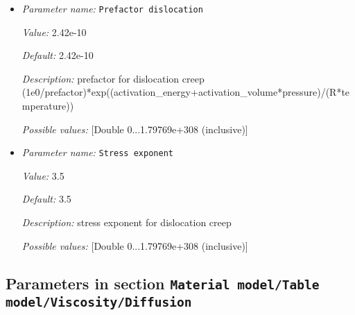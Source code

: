 \begin{itemize}
{\it Default:} 1.92e-11


{\it Description:} prefactor for diffusion creep (1e0/prefactor)*exp((activation\_energy+activation\_volume*pressure)/(R*temperature))


{\it Possible values:} [Double 0...1.79769e+308 (inclusive)]
\item {\it Parameter name:} {\tt Prefactor dislocation}


{\it Value:} 2.42e-10


{\it Default:} 2.42e-10


{\it Description:} prefactor for dislocation creep (1e0/prefactor)*exp((activation\_energy+activation\_volume*pressure)/(R*temperature))


{\it Possible values:} [Double 0...1.79769e+308 (inclusive)]
\item {\it Parameter name:} {\tt Stress exponent}


{\it Value:} 3.5


{\it Default:} 3.5


{\it Description:} stress exponent for dislocation creep


{\it Possible values:} [Double 0...1.79769e+308 (inclusive)]
\end{itemize}

\subsection{Parameters in section \tt Material model/Table model/Viscosity/Diffusion}
\label{parameters:Material_20model/Table_20model/Viscosity/Diffusion}

